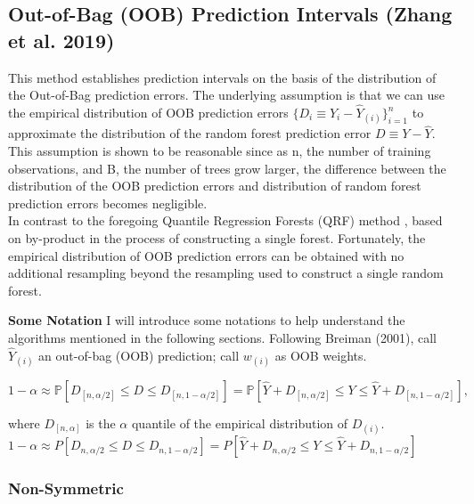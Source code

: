 \documentclass{article}
\begin{document}
\begin{equation}

\end{equation}

\subsection{Out-of-Bag (OOB) Prediction Intervals (Zhang et al. 2019)}
This method establishes prediction intervals on the basis of the distribution of the Out-of-Bag prediction errors. The underlying assumption is that we can use the empirical distribution of OOB prediction errors $\{D_{i} \equiv Y_{i}-\hat{Y}_{(i)}\}_{i=1}^n$ to approximate the distribution of the random forest prediction error $D \equiv Y-\hat{Y}$.  This assumption is shown to be reasonable since as n, the number of training observations, and B, the number of trees grow larger, the difference between the distribution of the OOB prediction errors and distribution of random forest prediction errors becomes negligible. \\

In contrast to the foregoing Quantile Regression Forests (QRF) method
,
based on by-product in the process of constructing a single forest. Fortunately, the empirical distribution of OOB prediction errors can be obtained with no additional resampling beyond the resampling used to construct a single random forest.

\textbf{Some Notation} I will introduce some notations to help understand the algorithms mentioned in the following sections. Following Breiman (2001), call $\hat{Y}_{(i)}$ an out-of-bag (OOB) prediction; call $w_{(i)}$ as OOB weights.

\begin{equation}

1-\alpha \approx \mathbb{P}[D_{[n, \alpha/2]} \leqslant D  \leqslant D_{[n, 1- \alpha/2]} ]=  \mathbb{P}[\hat{Y}+D_{[n, \alpha/2]} \leqslant Y  \leqslant \hat{Y}+D_{[n, 1- \alpha/2]} ], 

\end{equation}

where $D_{[n, \alpha]}$ is the $\alpha$ quantile of the empirical distribution of $D_{(i)}$.\\
$1-\alpha \approx P[D_{n, \alpha/2} \leqslant D  \leqslant D_{n, 1- \alpha/2} ]=  P[\hat{Y}+D_{n, \alpha/2} \leqslant Y  \leqslant \hat{Y}+D_{n, 1- \alpha/2} ]$



\subsubsection{Non-Symmetric}
\end{document}
